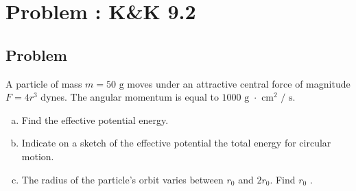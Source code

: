 \documentclass[solutions]{esg8012pset}
\date{Month Day\csname latex@error\endcsname {Date not yet decided}}
\begin{document}
\section{Problem \thesection: K\&K 9.2}
\subsection{Problem}
  A particle of mass $m = 50\text{ g}$ moves under an attractive central force of magnitude $F = 4r^3$ dynes. The angular momentum is equal to $1000\text{ g $\cdot$ cm$^2$ / s}$.
  \begin{enumerate}[(a)]
    \item Find the effective potential energy.
    \item Indicate on a sketch of the effective potential the total energy for circular motion.
    \item The radius of the particle's orbit varies between $r_0$ and $2r_0$. Find $r_0$ .
  \end{enumerate}
\end{document}
